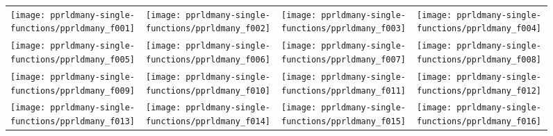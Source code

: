 \documentclass{sig-alternate}
\begin{document}
\begin{figure*}
\centering
\begin{tabular}{@{\hspace*{-0.018\textwidth}}l@{\hspace*{-0.02\textwidth}}l@{\hspace*{-0.02\textwidth}}l@{\hspace*{-0.02\textwidth}}l@{\hspace*{-0.02\textwidth}}}
\texttt{[image: pprldmany-single-functions/pprldmany\_f001]}&
\texttt{[image: pprldmany-single-functions/pprldmany\_f002]}&
\texttt{[image: pprldmany-single-functions/pprldmany\_f003]}&
\texttt{[image: pprldmany-single-functions/pprldmany\_f004]}\\[-1.8ex]
\texttt{[image: pprldmany-single-functions/pprldmany\_f005]}&
\texttt{[image: pprldmany-single-functions/pprldmany\_f006]}&
\texttt{[image: pprldmany-single-functions/pprldmany\_f007]}&
\texttt{[image: pprldmany-single-functions/pprldmany\_f008]}\\[-1.8ex]
\texttt{[image: pprldmany-single-functions/pprldmany\_f009]}&
\texttt{[image: pprldmany-single-functions/pprldmany\_f010]}&
\texttt{[image: pprldmany-single-functions/pprldmany\_f011]}&
\texttt{[image: pprldmany-single-functions/pprldmany\_f012]}\\[-1.8ex]
\texttt{[image: pprldmany-single-functions/pprldmany\_f013]}&
\texttt{[image: pprldmany-single-functions/pprldmany\_f014]}&
\texttt{[image: pprldmany-single-functions/pprldmany\_f015]}&
\texttt{[image: pprldmany-single-functions/pprldmany\_f016]}\\[-1.8ex]
\end{tabular}
 \caption{\label{fig:ECDFsingleOne}
 \bbobecdfcaptionsinglefcts{}
}

\end{figure*}
\end{document}
